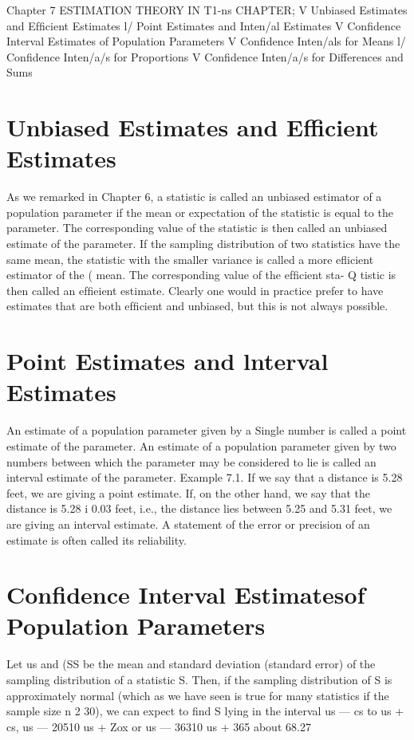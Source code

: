 Chapter 7
ESTIMATION
THEORY
IN T1-ns CHAPTER;
V Unbiased Estimates and
Efﬁcient Estimates
l/ Point Estimates and Inten/al Estimates
V Conﬁdence Interval Estimates of
Population Parameters
V Conﬁdence Inten/als for Means
l/ Conﬁdence Inten/a/s for Proportions
V Conﬁdence Inten/a/s for Differences
and Sums
\section{Unbiased Estimates and Efficient Estimates}
As we remarked in Chapter 6, a statistic is called an unbiased estimator
of a population parameter if the mean or expectation of the statistic is
equal to the parameter. The corresponding value of the statistic is then
called an unbiased estimate of the parameter.
If the sampling distribution of two statistics
have the same mean, the statistic with the smaller
variance is called a more eﬂicient estimator of the (
mean. The corresponding value of the efﬁcient sta-  Q
tistic is then called an efﬁeient estimate. Clearly
one would in practice prefer to have estimates that
are both efﬁcient and unbiased, but this is not
always possible.

\section{Point Estimates and lnterval Estimates}
An estimate of a population parameter given by a Single number is
called a point estimate of the parameter. An estimate of a population
parameter given by two numbers between which the parameter may be
considered to lie is called an interval estimate of the parameter.
Example 7.1. If we say that a distance is 5.28 feet, we are giving a
point estimate. If, on the other hand, we say that the distance is
5.28 i 0.03 feet, i.e., the distance lies between 5.25 and 5.31 feet, we
are giving an interval estimate.
A statement of the error or precision of an estimate is often called
its reliability.
\section{Confidence Interval Estimatesof Population Parameters}
Let us and (SS be the mean and standard deviation (standard error) of the
sampling distribution of a statistic S. Then, if the sampling distribution
of S is approximately normal (which as we have seen is true for many
statistics if the sample size n 2 30), we can expect to ﬁnd S lying in the
interval us — cs to us + cs, us — 20510 us + Zox or us — 36310 us + 365
about 68.27%

